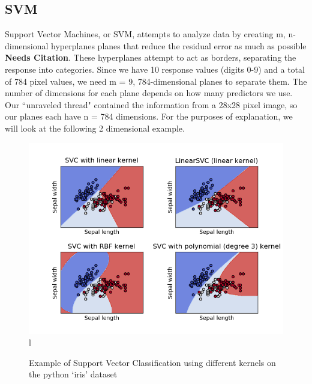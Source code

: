\documentclass[11pt, oneside]{article}   	%
\begin{document}
\subsection{SVM}
Support Vector Machines, or SVM, attempts to analyze data by creating m, n-dimensional hyperplanes planes that reduce the residual error as much as possible \textbf{Needs Citation}. These hyperplanes attempt to act as borders, separating the response into categories. Since we have 10 response values (digits 0-9) and a total of 784 pixel values, we need m = 9, 784-dimensional planes to separate them. The number of dimensions for each plane depends on how many predictors we use. Our ``unraveled thread" contained the information from a 28x28 pixel image, so our planes each have n = 784 dimensions. For the purposes of explanation, we will look at the following 2 dimensional example.
\begin{figure}
\caption{Example of Support Vector Classification using different kernels on the python `iris' dataset}
\includegraphics[width=\textwidth]{Figure_1.png}l
\end{figure}
\end{document}
